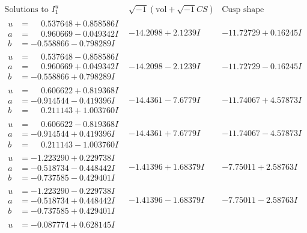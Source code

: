 \documentclass[1p]{elsarticle_modified}
\theoremstyle{definition}
\newcommand{\I}{\sqrt{-1}}
\begin{document}
$$\begin{array}{c|c|c}  
\text{Solutions to }I^u_{1}& \I (\text{vol} + \sqrt{-1}CS) & \text{Cusp shape}\\
 \hline 
\begin{aligned}
u &= \phantom{-}0.537648 + 0.858586 I \\
a &= \phantom{-}0.960669 - 0.049342 I \\
b &= -0.558866 - 0.798289 I\end{aligned}
 & -14.2098 + 2.1239 I & -11.72729 + 0.16245 I \\ \hline\begin{aligned}
u &= \phantom{-}0.537648 - 0.858586 I \\
a &= \phantom{-}0.960669 + 0.049342 I \\
b &= -0.558866 + 0.798289 I\end{aligned}
 & -14.2098 - 2.1239 I & -11.72729 - 0.16245 I \\ \hline\begin{aligned}
u &= \phantom{-}0.606622 + 0.819368 I \\
a &= -0.914544 - 0.419396 I \\
b &= \phantom{-}0.211143 + 1.003760 I\end{aligned}
 & -14.4361 - 7.6779 I & -11.74067 + 4.57873 I \\ \hline\begin{aligned}
u &= \phantom{-}0.606622 - 0.819368 I \\
a &= -0.914544 + 0.419396 I \\
b &= \phantom{-}0.211143 - 1.003760 I\end{aligned}
 & -14.4361 + 7.6779 I & -11.74067 - 4.57873 I \\ \hline\begin{aligned}
u &= -1.223290 + 0.229738 I \\
a &= -0.518734 - 0.448442 I \\
b &= -0.737585 - 0.429401 I\end{aligned}
 & -1.41396 + 1.68379 I & -7.75011 + 2.58763 I \\ \hline\begin{aligned}
u &= -1.223290 - 0.229738 I \\
a &= -0.518734 + 0.448442 I \\
b &= -0.737585 + 0.429401 I\end{aligned}
 & -1.41396 - 1.68379 I & -7.75011 - 2.58763 I \\ \hline\begin{aligned}
u &= -0.087774 + 0.628145 I \\

\end{aligned}
\end{array}$$
\end{document}
